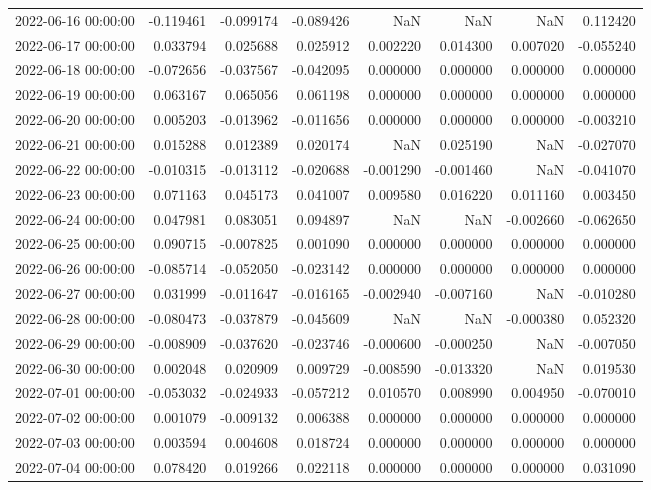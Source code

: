 \begin{tabular}{lrrrrrrr}
2022-06-16 00:00:00 & -0.119461 & -0.099174 & -0.089426 & NaN & NaN & NaN & 0.112420 \\
2022-06-17 00:00:00 & 0.033794 & 0.025688 & 0.025912 & 0.002220 & 0.014300 & 0.007020 & -0.055240 \\
2022-06-18 00:00:00 & -0.072656 & -0.037567 & -0.042095 & 0.000000 & 0.000000 & 0.000000 & 0.000000 \\
2022-06-19 00:00:00 & 0.063167 & 0.065056 & 0.061198 & 0.000000 & 0.000000 & 0.000000 & 0.000000 \\
2022-06-20 00:00:00 & 0.005203 & -0.013962 & -0.011656 & 0.000000 & 0.000000 & 0.000000 & -0.003210 \\
2022-06-21 00:00:00 & 0.015288 & 0.012389 & 0.020174 & NaN & 0.025190 & NaN & -0.027070 \\
2022-06-22 00:00:00 & -0.010315 & -0.013112 & -0.020688 & -0.001290 & -0.001460 & NaN & -0.041070 \\
2022-06-23 00:00:00 & 0.071163 & 0.045173 & 0.041007 & 0.009580 & 0.016220 & 0.011160 & 0.003450 \\
2022-06-24 00:00:00 & 0.047981 & 0.083051 & 0.094897 & NaN & NaN & -0.002660 & -0.062650 \\
2022-06-25 00:00:00 & 0.090715 & -0.007825 & 0.001090 & 0.000000 & 0.000000 & 0.000000 & 0.000000 \\
2022-06-26 00:00:00 & -0.085714 & -0.052050 & -0.023142 & 0.000000 & 0.000000 & 0.000000 & 0.000000 \\
2022-06-27 00:00:00 & 0.031999 & -0.011647 & -0.016165 & -0.002940 & -0.007160 & NaN & -0.010280 \\
2022-06-28 00:00:00 & -0.080473 & -0.037879 & -0.045609 & NaN & NaN & -0.000380 & 0.052320 \\
2022-06-29 00:00:00 & -0.008909 & -0.037620 & -0.023746 & -0.000600 & -0.000250 & NaN & -0.007050 \\
2022-06-30 00:00:00 & 0.002048 & 0.020909 & 0.009729 & -0.008590 & -0.013320 & NaN & 0.019530 \\
2022-07-01 00:00:00 & -0.053032 & -0.024933 & -0.057212 & 0.010570 & 0.008990 & 0.004950 & -0.070010 \\
2022-07-02 00:00:00 & 0.001079 & -0.009132 & 0.006388 & 0.000000 & 0.000000 & 0.000000 & 0.000000 \\
2022-07-03 00:00:00 & 0.003594 & 0.004608 & 0.018724 & 0.000000 & 0.000000 & 0.000000 & 0.000000 \\
2022-07-04 00:00:00 & 0.078420 & 0.019266 & 0.022118 & 0.000000 & 0.000000 & 0.000000 & 0.031090 \\

\end{tabular}
